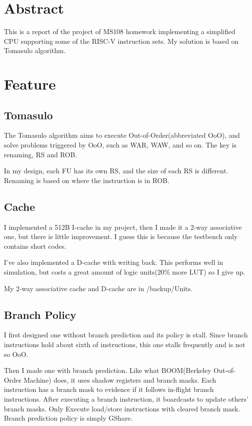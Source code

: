 \documentclass[12pt,letterpaper]{article}
\begin{document}
\section{Abstract}
    This is a report of the project of MS108 homework implementing a simplified CPU supporting some of the RISC-V instruction sets. 
    My solution is based on Tomasulo algorithm. 
\section{Feature}
\subsection{Tomasulo}
    The Tomasulo algorithm aims to execute Out-of-Order(abbreviated OoO), 
    and solve problems triggered by OoO, such as WAR, WAW, and so on. The key is renaming, 
    RS and ROB. 

    In my design, each FU has its own RS, and the size of each RS is different. 
    Renaming is based on where the instruction is in ROB. 
\subsection{Cache}
    I implemented a 512B I-cache in my project, then I made it a 2-way associative one, but there is little improvement. 
    I guess this is because the testbench only contains short codes. 

    I've also implemented a D-cache with writing back. This performs well in simulation, 
    but costs a great amount of logic units(20\% more LUT) so I give up. 

    My 2-way associative cache and D-cache are in /backup/Units. 
\subsection{Branch Policy}
    I first designed one without branch prediction and its policy is stall. Since branch instructions hold about sixth of instructions, 
    this one stalls frequently and is not so OoO. 

    Then I made one with branch prediction. Like what BOOM(Berkeley Out-of-Order Machine) does, it uses shadow registers and branch masks. 
    Each instruction has a branch mask to evidence if it follows in-flight branch instructions. After executing a branch instruction, 
    it boardcasts to update others' branch masks. Only Execute load/store instructions with cleared branch mask. Branch prediction policy is simply GShare. 
    
\end{document}
